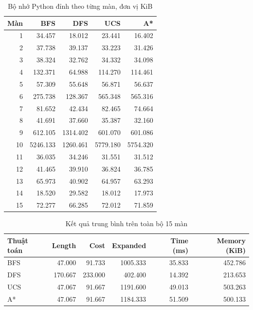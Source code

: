 \begin{table}[htbp]
\centering
\small
\caption{Bộ nhớ Python đỉnh theo từng màn, đơn vị KiB}
\begin{tabular}{|r|r|r|r|r|}
\hline
Màn & BFS & DFS & UCS & A* \\\hline
1  & 34.457   & 18.012   & 23.441   & 16.402   \\\hline
2  & 37.738   & 39.137   & 33.223   & 31.426   \\\hline
3  & 38.324   & 32.762   & 34.332   & 34.098   \\\hline
4  & 132.371  & 64.988   & 114.270  & 114.461  \\\hline
5  & 57.309   & 55.648   & 56.871   & 56.637   \\\hline
6  & 275.738  & 128.367  & 565.348  & 565.316  \\\hline
7  & 81.652   & 42.434   & 82.465   & 74.664   \\\hline
8  & 41.691   & 37.660   & 35.387   & 32.160   \\\hline
9  & 612.105  & 1314.402 & 601.070  & 601.086  \\\hline
10 & 5246.133 & 1260.461 & 5779.180 & 5754.320 \\\hline
11 & 36.035   & 34.246   & 31.551   & 31.512   \\\hline
12 & 41.465   & 39.910   & 36.824   & 36.785   \\\hline
13 & 65.973   & 40.902   & 64.957   & 63.293   \\\hline
14 & 18.520   & 29.582   & 18.012   & 17.973   \\\hline
15 & 72.277   & 66.285   & 72.012   & 71.859   \\\hline
\end{tabular}
\end{table}

\begin{table}[htbp]
\centering
\small
\caption{Kết quả trung bình trên toàn bộ 15 màn}
\begin{tabular}{|l|r|r|r|r|r|}
\hline
Thuật toán & Length & Cost & Expanded & Time (ms) & Memory (KiB) \\\hline
BFS & 47.000  & 91.733  & 1005.333 & 35.833 & 452.786 \\\hline
DFS & 170.667 & 233.000 & 402.400  & 14.392 & 213.653 \\\hline
UCS & 47.067  & 91.667  & 1191.600 & 49.013 & 503.263 \\\hline
A*  & 47.067  & 91.667  & 1184.333 & 51.509 & 500.133 \\\hline
\end{tabular}
\end{table}


